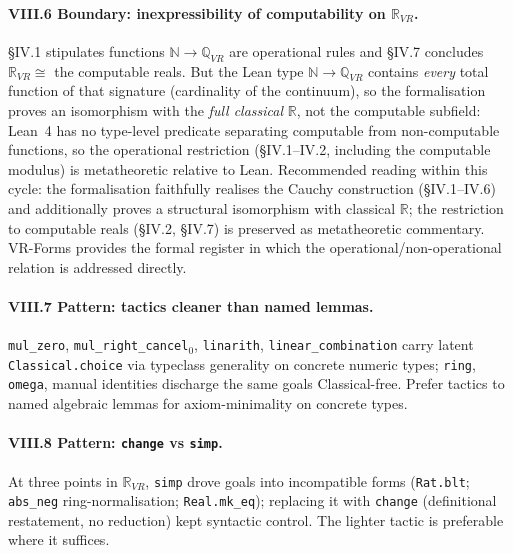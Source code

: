 \documentclass[11pt]{article}
\theoremstyle{definition}
\newcommand{\Q}{\mathbb{Q}}
\newcommand{\R}{\mathbb{R}}
\newcommand{\N}{\mathbb{N}}
\begin{document}
\paragraph{VIII.6 Boundary: inexpressibility of computability on $\R_{VR}$.} \S IV.1 stipulates
functions $\N\to\Q_{VR}$ are operational rules and \S IV.7 concludes $\R_{VR}\cong$ the computable
reals. But the Lean type $\N\to\Q_{VR}$ contains \emph{every} total function of that signature
(cardinality of the continuum), so the formalisation proves an isomorphism with the \emph{full
classical} $\R$, not the computable subfield: Lean~4 has no type-level predicate separating computable
from non-computable functions, so the operational restriction (\S IV.1--IV.2, including the computable
modulus) is metatheoretic relative to Lean. Recommended reading within this cycle: the formalisation
faithfully realises the Cauchy construction (\S IV.1--IV.6) and additionally proves a structural
isomorphism with classical $\R$; the restriction to computable reals (\S IV.2, \S IV.7) is preserved as
metatheoretic commentary. VR-Forms provides the formal register in which the operational/non-operational
relation is addressed directly.

\paragraph{VIII.7 Pattern: tactics cleaner than named lemmas.} \texttt{mul\_zero}, \texttt{mul\_right\_cancel}$_0$,
\texttt{linarith}, \texttt{linear\_combination} carry latent \texttt{Classical.choice} via typeclass
generality on concrete numeric types; \texttt{ring}, \texttt{omega}, manual identities discharge the same
goals Classical-free. Prefer tactics to named algebraic lemmas for axiom-minimality on concrete types.

\paragraph{VIII.8 Pattern: \texttt{change} vs \texttt{simp}.} At three points in $\R_{VR}$, \texttt{simp}
drove goals into incompatible forms (\texttt{Rat.blt}; \texttt{abs\_neg} ring-normalisation;
\texttt{Real.mk\_eq}); replacing it with \texttt{change} (definitional restatement, no reduction) kept
syntactic control. The lighter tactic is preferable where it suffices.

\end{document}
